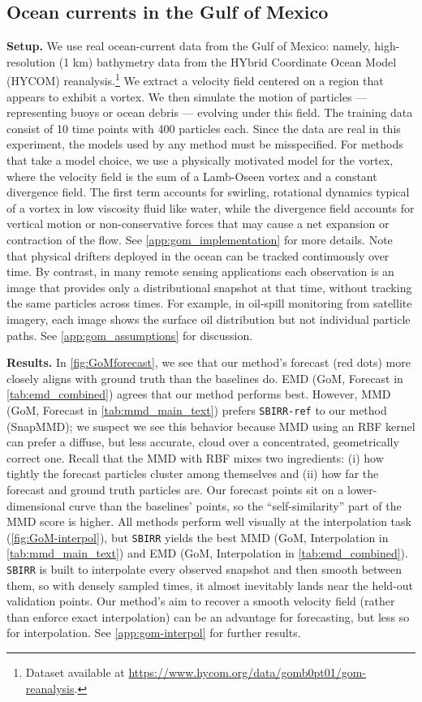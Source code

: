 \subsection{Ocean currents in the Gulf of Mexico}
\label{sec:gom-main}
\textbf{Setup.}
We use real ocean-current data from the Gulf of Mexico: namely, high-resolution (1 km) bathymetry data from the HYbrid Coordinate Ocean Model (HYCOM) reanalysis.\footnote{Dataset available at \url{https://www.hycom.org/data/gomb0pt01/gom-reanalysis}.} 
We extract a velocity field centered on a region that appears to exhibit a vortex. We then simulate the motion of particles --- representing buoys or ocean debris --- evolving under this field. The training data consist of 10 time points with 400 particles each. Since the data are real in this experiment, the models used by any method must be misspecified. For methods that take a model choice, we use a physically motivated model for the vortex, where the velocity field is the sum of a Lamb-Oseen vortex and a constant divergence field. The first term accounts for swirling, rotational dynamics typical of a vortex in low viscosity fluid like water, while the divergence field accounts for vertical motion or non-conservative forces that may cause a net expansion or contraction of the flow. See \cref{app:gom_implementation} for more details. Note that physical drifters deployed in the ocean can be tracked continuously over time. By contrast, in many remote sensing applications each observation is an image that provides only a distributional snapshot at that time, without tracking the same particles across times. For example, in oil-spill monitoring from satellite imagery, each image shows the surface oil distribution but not individual particle paths. See \cref{app:gom_assumptions} for discussion.




\textbf{Results.} In \cref{fig:GoMforecast}, we see that our method's forecast (red dots) more closely aligns with ground truth than the baselines do. EMD (GoM, Forecast in \cref{tab:emd_combined}) agrees that our method performs best. However, MMD (GoM, Forecast in \cref{tab:mmd_main_text}) prefers \texttt{SBIRR-ref} to our method (SnapMMD); 
we suspect we see this behavior because MMD using an RBF kernel can prefer a diffuse, but less accurate, cloud over a concentrated, geometrically correct one.
Recall that the MMD with RBF mixes two ingredients: (i) how tightly the forecast particles cluster among themselves and (ii) how far the forecast and ground truth particles are. Our forecast points sit on a lower-dimensional curve than the baselines' points, so the ``self-similarity'' part of the MMD score is higher. 
All methods perform well visually at the interpolation task (\cref{fig:GoM-interpol}), but \texttt{SBIRR} yields the best MMD (GoM, Interpolation in \cref{tab:mmd_main_text}) and EMD (GoM, Interpolation in \cref{tab:emd_combined}). \texttt{SBIRR} is built to interpolate every observed snapshot and then smooth between them, so with densely sampled times, it almost inevitably lands near the held-out validation points. Our method's aim to recover a smooth velocity field (rather than enforce exact interpolation) can be an advantage for forecasting, but less so for interpolation. See \cref{app:gom-interpol} for further results.


